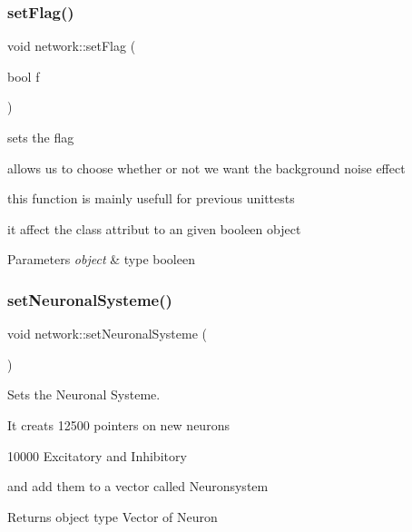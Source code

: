 \subsubsection{\texorpdfstring{set\+Flag()}{setFlag()}}
{\footnotesize\ttfamily void network\+::set\+Flag (\begin{DoxyParamCaption}\item[{bool}]{f }\end{DoxyParamCaption})}



sets the flag 

allows us to choose whether or not we want the background noise effect

this function is mainly usefull for previous unittests

it affect the class attribut to an given booleen object


\begin{DoxyParams}{Parameters}
{\em object} & type booleen \\
\hline
\end{DoxyParams}
\mbox{\label{classnetwork_af9105fac7338bbd113d0823f837cf217}} 
\subsubsection{\texorpdfstring{set\+Neuronal\+Systeme()}{setNeuronalSysteme()}}
{\footnotesize\ttfamily void network\+::set\+Neuronal\+Systeme (\begin{DoxyParamCaption}{ }\end{DoxyParamCaption})}



Sets the Neuronal Systeme. 

It creats 12500 pointers on new neurons

10000 Excitatory and Inhibitory

and add them to a vector called Neuronsystem

\begin{DoxyReturn}{Returns}
object type Vector of Neuron 
\end{DoxyReturn}
\mbox{\label{classnetwork_a6dda83ae384498619f0aa876639b2c25}} 
